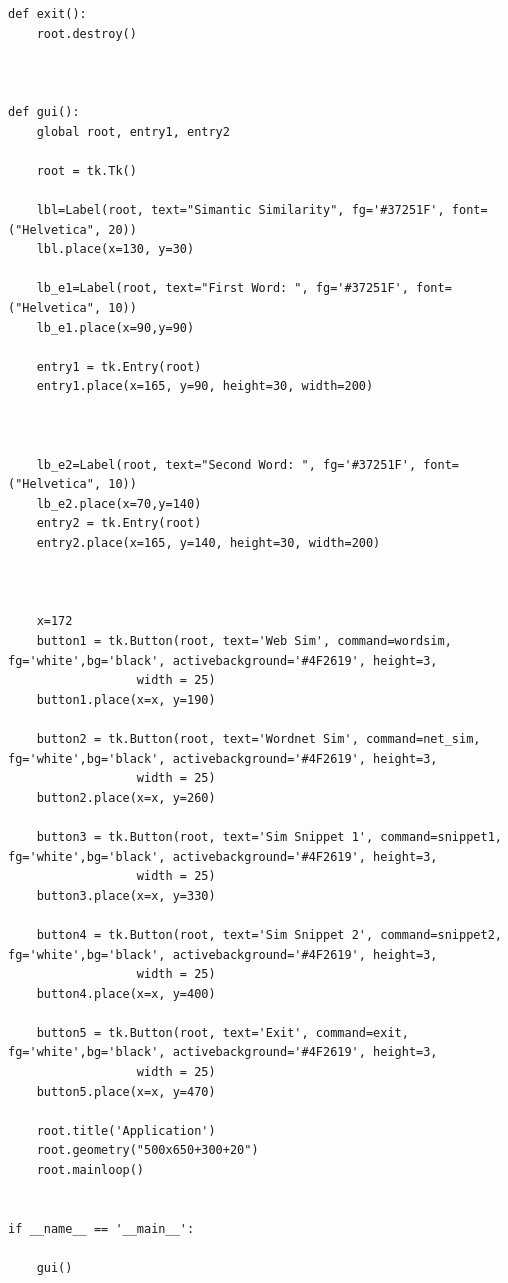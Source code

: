 \documentclass[conference]{IEEEtran}
\begin{document}
\begin{appendices}
\begin{lstlisting}
def exit():
    root.destroy()
    


def gui():
    global root, entry1, entry2
    
    root = tk.Tk()

    lbl=Label(root, text="Simantic Similarity", fg='#37251F', font=("Helvetica", 20))
    lbl.place(x=130, y=30)
    
    lb_e1=Label(root, text="First Word: ", fg='#37251F', font=("Helvetica", 10))
    lb_e1.place(x=90,y=90)
    
    entry1 = tk.Entry(root) 
    entry1.place(x=165, y=90, height=30, width=200)



    lb_e2=Label(root, text="Second Word: ", fg='#37251F', font=("Helvetica", 10))
    lb_e2.place(x=70,y=140)    
    entry2 = tk.Entry(root)
    entry2.place(x=165, y=140, height=30, width=200)
    
    
    
    x=172
    button1 = tk.Button(root, text='Web Sim', command=wordsim, fg='white',bg='black', activebackground='#4F2619', height=3,
                  width = 25)
    button1.place(x=x, y=190)
    
    button2 = tk.Button(root, text='Wordnet Sim', command=net_sim, fg='white',bg='black', activebackground='#4F2619', height=3,
                  width = 25)
    button2.place(x=x, y=260)
    
    button3 = tk.Button(root, text='Sim Snippet 1', command=snippet1, fg='white',bg='black', activebackground='#4F2619', height=3,
                  width = 25)
    button3.place(x=x, y=330)
    
    button4 = tk.Button(root, text='Sim Snippet 2', command=snippet2, fg='white',bg='black', activebackground='#4F2619', height=3,
                  width = 25)
    button4.place(x=x, y=400)

    button5 = tk.Button(root, text='Exit', command=exit, fg='white',bg='black', activebackground='#4F2619', height=3,
                  width = 25)
    button5.place(x=x, y=470)
    
    root.title('Application')
    root.geometry("500x650+300+20")
    root.mainloop()


if __name__ == '__main__':

    gui()
\end{lstlisting}
\end{appendices}
\end{document}
